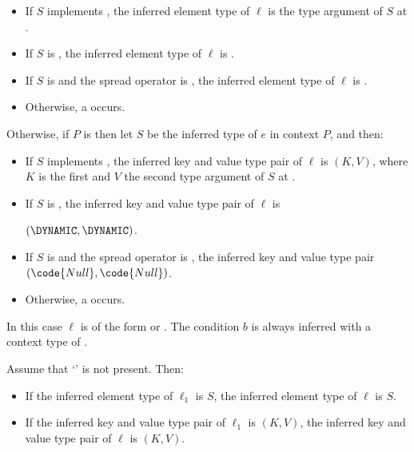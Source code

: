 \documentclass[makeidx]{article}
\begin{document}
{\begin{itemize}
\item
  If $S$ implements ,
  the inferred element type of $\ell$ is
  the type argument of $S$ at .
\item
  If $S$ is \DYNAMIC,
  the inferred element type of $\ell$ is \DYNAMIC.
\item
  If $S$ is  and the spread operator is ,
  the inferred element type of $\ell$ is .
\item
  Otherwise, a  occurs.
\end{itemize}

\noindent
Otherwise, if $P$ is  then let $S$ be
the inferred type of $e$ in context $P$, and then:

\begin{itemize}
\item
  If $S$ implements ,
  the inferred key and value type pair of $\ell$ is $(K, V)$,
  where $K$ is the first and $V$ the second type argument of
  $S$ at .
\item
  If $S$ is \DYNAMIC,
  the inferred key and value type pair of $\ell$ is

  \noindent
  $(\DYNAMIC, \DYNAMIC)$.
\item
  If $S$ is  and the spread operator is ,
  the inferred key and value type pair $(\code{Null}, \code{Null})$.
\item
  Otherwise, a  occurs.
\end{itemize}
\vspace{-5mm}
\EndCase

\LMHash{}%
In this case $\ell$ is of the form
 or
.
The condition $b$ is always inferred with a context type of .

Assume that `' is not present. Then:
\begin{itemize}
\item
  If the inferred element type of $\ell_1$ is $S$,
  the inferred element type of $\ell$ is $S$.
\item
  If the inferred key and value type pair of $\ell_1$ is $(K, V)$,
  the inferred key and value type pair of $\ell$ is $(K, V)$.
\end{itemize}

}
\end{document}
